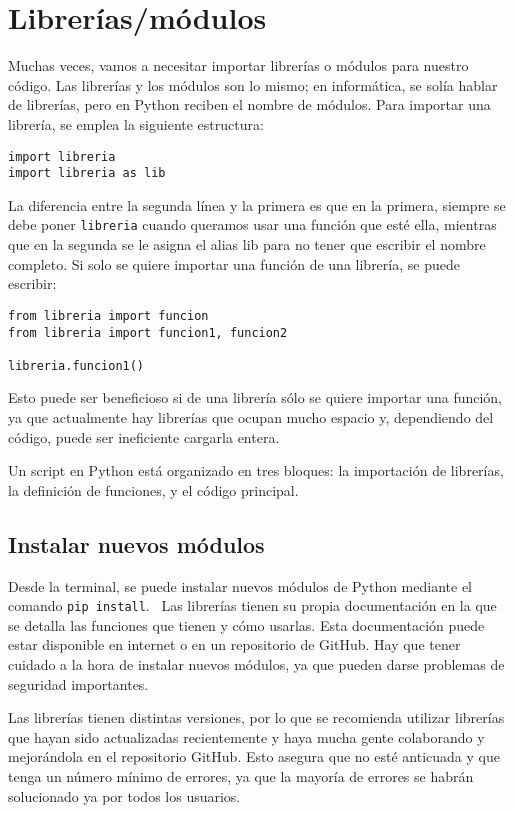 \section{Librerías/módulos}
Muchas veces, vamos a necesitar importar librerías o módulos para nuestro código. Las librerías y los módulos son lo mismo; en informática, se solía hablar de librerías, pero en Python reciben el nombre de módulos. Para importar una librería, se emplea la siguiente estructura:
\begin{lstlisting}
import libreria
import libreria as lib
\end{lstlisting}
La diferencia entre la segunda línea y la primera es que en la primera, siempre se debe poner \texttt{libreria} cuando queramos usar una función que esté ella, mientras que en la segunda se le asigna el alias lib para no tener que escribir el nombre completo. Si solo se quiere importar una función de una librería, se puede escribir:
\begin{lstlisting}
from libreria import funcion
from libreria import funcion1, funcion2

libreria.funcion1()
\end{lstlisting}
Esto puede ser beneficioso si de una librería sólo se quiere importar una función, ya que actualmente hay librerías que ocupan mucho espacio y, dependiendo del código, puede ser ineficiente cargarla entera. 

\begin{table}[htbp]
\begin{mdframed}[backgroundcolor=black!10]
    \centering
    Un script en Python está organizado en tres bloques: la importación de librerías, la definición de funciones, y el código principal.
    \end{mdframed}
\end{table}

\subsection{Instalar nuevos módulos}
Desde la terminal, se puede instalar nuevos módulos de Python mediante el comando \texttt{pip install}.   \ Las librerías tienen su propia documentación en la que se detalla las funciones que tienen y cómo usarlas. Esta documentación puede estar disponible en internet o en un repositorio de GitHub. Hay que tener cuidado a la hora de instalar nuevos módulos, ya que pueden darse problemas de seguridad importantes. 

Las librerías tienen distintas versiones, por lo que se recomienda utilizar librerías que hayan sido actualizadas recientemente y haya mucha gente colaborando y mejorándola en el repositorio GitHub. Esto asegura que no esté anticuada y que tenga un número mínimo de errores, ya que la mayoría de errores se habrán solucionado ya por todos los usuarios. 


